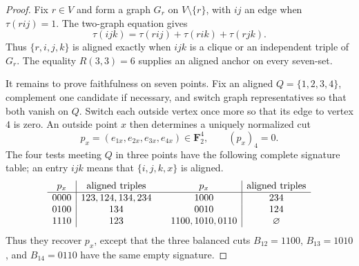 \begin{proof}
Fix \(r\in V\) and form a graph \(G_r\) on \(V\setminus\{r\}\), with \(ij\)
an edge when \(\tau(rij)=1\).  The two-graph equation gives
\[
 \tau(ijk)=\tau(rij)+\tau(rik)+\tau(rjk).
\]
Thus \(\{r,i,j,k\}\) is aligned exactly when \(ijk\) is a clique or an
independent triple of \(G_r\).  The equality \(R(3,3)=6\) supplies an aligned
anchor on every seven-set.

It remains to prove faithfulness on seven points.  Fix an aligned
\(Q=\{1,2,3,4\}\), complement one candidate if necessary, and switch graph
representatives so that both vanish on \(Q\).  Switch each outside vertex
once more so that its edge to vertex \(4\) is zero.  An outside point \(x\)
then determines a uniquely normalized cut
\[
 p_x=(e_{1x},e_{2x},e_{3x},e_{4x})
 \in\mathbf F_2^4,\qquad (p_x)_4=0.
\]
The four tests meeting \(Q\) in three points have the following complete
signature table; an entry \(ijk\) means that \(\{i,j,k,x\}\) is aligned.
\[
\begin{array}{c|c@{\qquad}c|c}
p_x&\text{aligned triples}&p_x&\text{aligned triples}\\ \hline
0000&123,124,134,234&1000&234\\
0100&134&0010&124\\
1110&123&1100,1010,0110&\varnothing
\end{array}
\]
Thus they recover \(p_x\), except that the three balanced cuts
\(B_{12}=1100\), \(B_{13}=1010\), and \(B_{14}=0110\) have the same empty
signature.


\end{proof}
